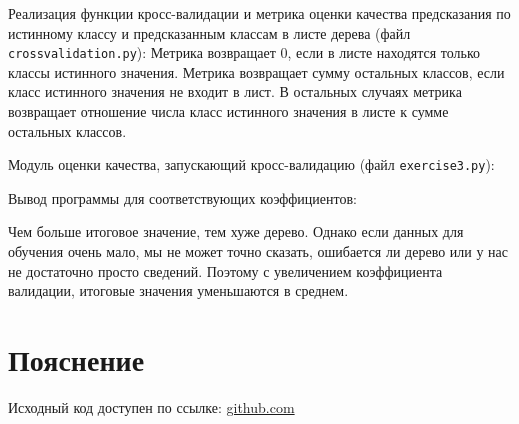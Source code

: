 \documentclass{article} %
\begin{document}
Реализация функции кросс-валидации
и метрика оценки качества предсказания
по истинному классу и предсказанным классам в листе дерева
(файл \verb$crossvalidation.py$):
Метрика возвращает 0,
если в листе находятся только классы истинного значения.
Метрика возвращает сумму остальных классов, если класс истинного значения
не входит в лист.
В остальных случаях метрика возвращает отношение числа класс истинного значения
в листе к сумме остальных классов.
\bigskip

Модуль оценки качества, запускающий кросс-валидацию (файл \verb$exercise3.py$):
\bigskip

Вывод программы для соответствующих коэффициентов:


Чем больше итоговое значение, тем хуже дерево.
Однако если данных для обучения очень мало,
мы не может точно сказать,
ошибается ли дерево или у нас не достаточно просто сведений.
Поэтому с увеличением коэффициента валидации,
итоговые значения уменьшаются в среднем.

\section{Пояснение}
Исходный код доступен по ссылке:
\href{https://github.com/SvichkarevAnatoly/Course-Python-Bioinformatics/tree/master/semester2/task5}
{github.com}
\end{document}

